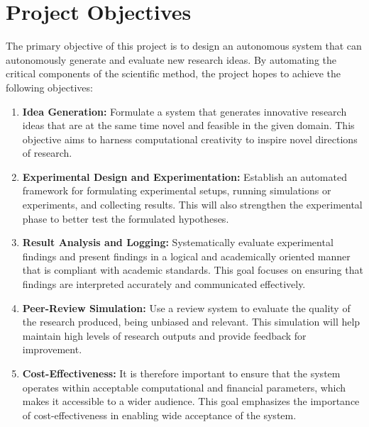 \section{Project Objectives}  
The primary objective of this project is to design an autonomous system that can autonomously generate and evaluate new research ideas. By automating the critical components of the scientific method, the project hopes to achieve the following objectives:  
\begin{enumerate}
    \item \textbf{Idea Generation:} Formulate a system that generates innovative research ideas that are at the same time novel and feasible in the given domain. This objective aims to harness computational creativity to inspire novel directions of research.

    \item \textbf{Experimental Design and Experimentation:} Establish an automated framework for formulating experimental setups, running simulations or experiments, and collecting results. This will also strengthen the experimental phase to better test the formulated hypotheses.

    \item \textbf{Result Analysis and Logging:} Systematically evaluate experimental findings and present findings in a logical and academically oriented manner that is compliant with academic standards. This goal focuses on ensuring that findings are interpreted accurately and communicated effectively.

    \item \textbf{Peer-Review Simulation:} Use a review system to evaluate the quality of the research produced, being unbiased and relevant. This simulation will help maintain high levels of research outputs and provide feedback for improvement.

    \item \textbf{Cost-Effectiveness:} It is therefore important to ensure that the system operates within acceptable computational and financial parameters, which makes it accessible to a wider audience. This goal emphasizes the importance of cost-effectiveness in enabling wide acceptance of the system.
\end{enumerate}

